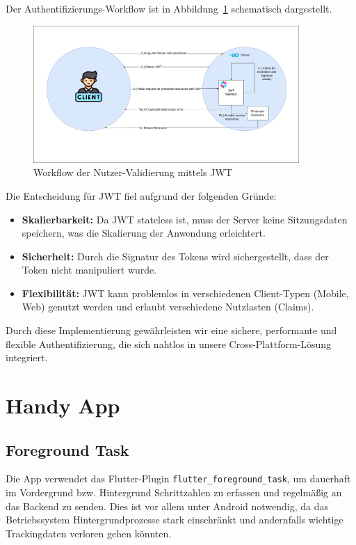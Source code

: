 \documentclass[11pt,a4paper]{article}
\begin{document}
Der Authentifizierungs-Workflow ist in Abbildung~\ref{fig:validation-workflow} schematisch dargestellt.

\begin{figure}[H]
    \centering
    \includegraphics[width=0.9\textwidth]{images/ValidationWorkflow.png}
    \caption{Workflow der Nutzer-Validierung mittels JWT}
    \label{fig:validation-workflow}
\end{figure}

Die Entscheidung für JWT fiel aufgrund der folgenden Gründe:
\begin{itemize}
    \item \textbf{Skalierbarkeit:} Da JWT stateless ist, muss der Server keine Sitzungsdaten speichern, was die Skalierung der Anwendung erleichtert.
    \item \textbf{Sicherheit:} Durch die Signatur des Tokens wird sichergestellt, dass der Token nicht manipuliert wurde.
    \item \textbf{Flexibilität:} JWT kann problemlos in verschiedenen Client-Typen (Mobile, Web) genutzt werden und erlaubt verschiedene Nutzlasten (Claims).
\end{itemize}

Durch diese Implementierung gewährleisten wir eine sichere, performante und flexible Authentifizierung, die sich nahtlos in unsere Cross-Plattform-Lösung integriert.




\section{Handy App}
\subsection{Foreground Task}

Die App verwendet das Flutter-Plugin \texttt{flutter\_foreground\_task}\cite{flutter_foreground_task}, um dauerhaft im Vordergrund bzw. Hintergrund Schrittzahlen zu erfassen und regelmäßig an das Backend zu senden. Dies ist vor allem unter Android notwendig, da das Betriebssystem Hintergrundprozesse stark einschränkt und andernfalls wichtige Trackingdaten verloren gehen könnten.
\end{document}
